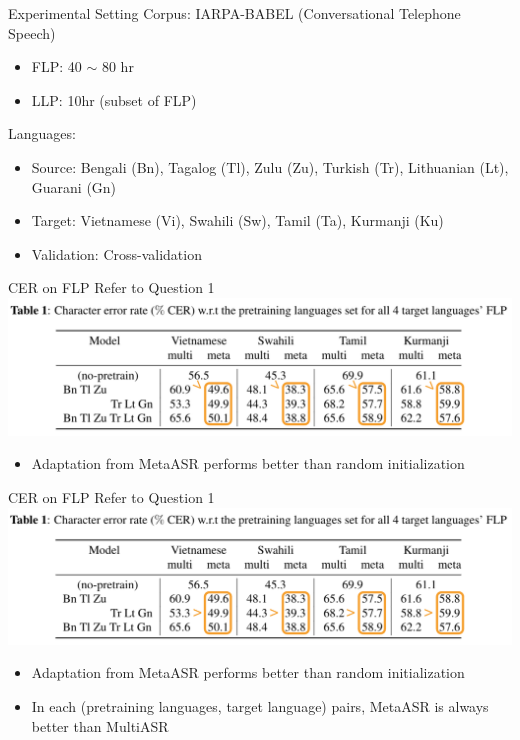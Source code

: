 \documentclass{beamer}
\begin{document}
\begin{frame}[t]{Experimental Setting}
  Corpus: IARPA-BABEL (Conversational Telephone Speech)
  \begin{itemize}
    \item FLP: 40 $\sim$ 80 hr
    \item LLP: 10hr (subset of FLP)
  \end{itemize}
  \pause
  Languages:
  \begin{itemize}
    \item Source: Bengali (Bn), Tagalog (Tl), Zulu (Zu), Turkish (Tr), Lithuanian (Lt), Guarani (Gn)
    \item Target: Vietnamese (Vi), Swahili (Sw), Tamil (Ta), Kurmanji (Ku)
    \item Validation: Cross-validation
  \end{itemize}
\end{frame}

\begin{frame}[t]{CER on FLP}
  Refer to Question 1
  \center \includegraphics[width=1.0\textwidth]{fig/flp_hl1.png}

  \begin{itemize}
    \item Adaptation from MetaASR performs better than random initialization
  \end{itemize}
\end{frame}

\begin{frame}[t]{CER on FLP}
  Refer to Question 1
  \center \includegraphics[width=1.0\textwidth]{fig/flp_hl2.png}

  \begin{itemize}
    \item Adaptation from MetaASR performs better than random initialization
    \item In each (pretraining languages, target language) pairs, MetaASR is always better than MultiASR
  \end{itemize}
\end{frame}
\end{document}

